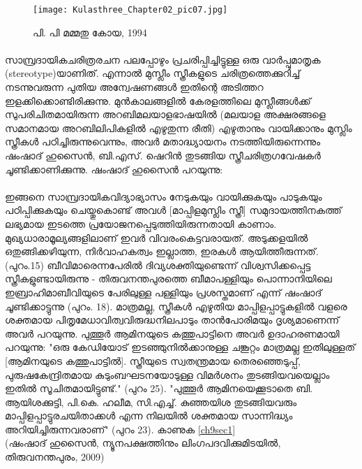 \begin{figure}[h]
\begin{center}
\texttt{[image: Kulasthree\_Chapter02\_pic07.jpg]}
\end{center}
\caption*{പി. പി മമ്മതു കോയ, 1994}
\end{figure}

\label{ch2box5} %
\begin{tcolorbox}[%
  breakable, %
  arc=0mm, 
  left=1pt, right = 1pt, 
  boxrule=0mm,
  colback = {blue!10}, %
] 

\paragraph{} സാമ്പ്രദായികചരിത്രരചന പലപ്പോഴും പ്രചരിപ്പിച്ചിട്ടുള്ള ഒരു വാർപ്പുമാതൃക (stereotype)യാണിത്. എന്നാൽ മുസ്ലീം സ്ത്രീകളുടെ ചരിത്രത്തെക്കുറിച്ച് നടന്നുവരുന്ന പുതിയ അന്വേഷണങ്ങൾ ഇതിന്റെ അടിത്തറ ഇളക്കിക്കൊണ്ടിരിക്കുന്നു. മുൻകാലങ്ങളിൽ കേരളത്തിലെ മുസ്ലീങ്ങൾക്ക് സുപരിചിതമായിരുന്ന അറബിമലയാളഭാഷയിൽ (മലയാള അക്ഷരങ്ങളെ സമാനമായ അറബിലിപികളിൽ എഴുതുന്ന രീതി) എഴുതാനും വായിക്കാനും മുസ്ലിം സ്ത്രീകൾ പഠിച്ചിരുന്നുവെന്നും, അവർ മതാദ്ധ്യായനം നടത്തിയിരുന്നെന്നും ഷംഷാദ് ഹുസൈൻ, ബി.എസ്. ഷെറിൻ തുടങ്ങിയ സ്ത്രീചരിത്രഗവേഷകർ ചൂണ്ടിക്കാണിക്കുന്നു. ഷംഷാദ് ഹുസൈൻ പറയുന്നു:

\begin{tcolorbox}{} 
\paragraph{} ഇങ്ങനെ സാമ്പ്രദായികവിദ്യാഭ്യാസം നേടുകയും വായിക്കുകയും പാടുകയും പഠിപ്പിക്കുകയും ചെയ്തുകൊണ്ട് അവൾ [മാപ്പിളമുസ്ലിം സ്ത്രീ] സമുദായത്തിനകത്ത് ലഭ്യമായ ഇടത്തെ പ്രയോജനപ്പെടുത്തിയിരുന്നതായി കാണാം. മുഖ്യധാരാമൂല്യങ്ങളിലാണ് ഇവർ വിവരംകെട്ടവരായത്. അടുക്കളയിൽ ഒതുങ്ങിക്കഴിയുന്ന, നിർവാഹകത്വം ഇല്ലാത്ത, ഇരകൾ ആയിത്തീരുന്നത്. (പുറം.15) ബീവിമാരെന്നപേരിൽ ദിവ്യശക്തിയുണ്ടെന്ന് വിശ്വസിക്കപ്പെട്ട സ്ത്രീകളുണ്ടായിരുന്നു - തിരുവനന്തപുരത്തെ ബീമാപള്ളിയും പൊന്നാനിയിലെ ഇബ്രാഹിമാബീവിയുടെ പേരിലുള്ള പള്ളിയും പ്രശസ്തമാണ് എന്ന് ഷംഷാദ് ചൂണ്ടിക്കാട്ടുന്നു (പുറം. 18). മാത്രമല്ല, സ്ത്രീകൾ എഴുതിയ മാപ്പിളപ്പാട്ടുകളിൽ വളരെ ശക്തമായ പിതൃമേധാവിത്വവിരുദ്ധനിലപാടും താൻപോരിമയും ദൃശ്യമാണെന്ന് അവർ പറയുന്നു. പുത്തൂർ ആമിനയുടെ കത്തുപാട്ടിനെ അവർ ഉദാഹരണമായി പറയുന്നു: "ഒരു കേഡിയോട് ഇടഞ്ഞുനിൽക്കാനുള്ള ചങ്കൂറ്റം മാത്രമല്ല ഇതിലുള്ളത് [ആമിനയുടെ കത്തുപാട്ടിൽ]. സ്ത്രീയുടെ സ്വതന്ത്രമായ തെരഞ്ഞെടുപ്പ്, പുരുഷകേന്ദ്രിതമായ കുടുംബഘടനയോടുള്ള വിമർശനം തുടങ്ങിയവയെല്ലാം ഇതിൽ സൂചിതമായിട്ടുണ്ട്." (പുറം 25). "പുത്തൂർ ആമിനയെക്കൂടാതെ ബി. ആയിശക്കുട്ടി, പി.കെ. ഹലീമ, സി.എച്ച്. കുഞ്ഞയിശ തുടങ്ങിയവരും മാപ്പിളപ്പാട്ടുരചയിതാക്കൾ എന്ന നിലയിൽ ശക്തമായ സാന്നിദ്ധ്യം അറിയിച്ചിരുന്നവരാണ്" (പുറം 23). കാണുക \ref{ch9sec1} \\
(ഷംഷാദ് ഹുസൈൻ, ന്യൂനപക്ഷത്തിനും ലിംഗപദവിക്കുമിടയിൽ, തിരുവനന്തപുരം, 2009)

\end{tcolorbox}
\end{tcolorbox}

